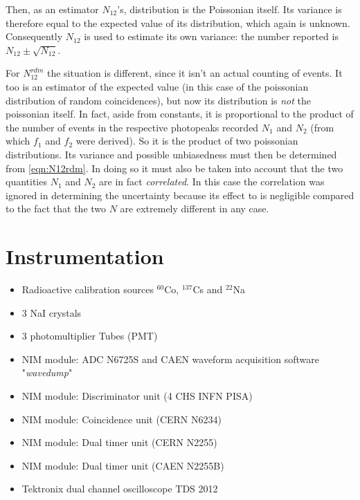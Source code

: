 \documentclass[10pt,a4paper,twocolumn]{article}
\begin{document}
\begin{appendices}
Then, as an estimator $N_{12}$'s, distribution is the Poissonian itself. Its variance is therefore equal to the expected value of its distribution, which again is unknown. Consequently $N_{12}$ is used to estimate its own variance: the number reported is $N_{12} \pm \sqrt{N_{12}}$. 

For $N_{12}^{rdm}$ the situation is different, since it isn't an actual counting of events. It too is an estimator of the expected value (in this case of the poissonian distribution of random coincidences), but now its distribution is \textit{not} the poissonian itself. In fact, aside from constants, it is proportional to the product of the number of events in the respective photopeaks recorded $N_1$ and $N_2$ (from which $f_1$ and $f_2$ were derived). So it is the product of two poissonian distributions. Its variance and possible unbiasedness must then be determined from \ref{eqn:N12rdm}. In doing so it must also be taken into account that the two quantities $N_1$ and $N_2$ are in fact \textit{correlated}. In this case the correlation was ignored in determining the uncertainty because its effect to is negligible compared to the fact that the two $N$ are extremely different in any case.  


\section{Instrumentation}\label{appendix:strumentation}

\begin{itemize}
\item Radioactive calibration sources $^{60}$Co, $^{137}$Cs and $^{22}$Na
\item 3 NaI crystals
\item 3 photomultiplier Tubes (PMT) 
 \item NIM module: ADC N6725S and CAEN waveform acquisition software "\textit{wavedump}" 
\item NIM module: Discriminator unit (4 CHS INFN PISA)
\item NIM module: Coincidence unit (CERN N6234)
   \item NIM module: Dual timer unit (CERN N2255)
  \item NIM module: Dual timer unit (CAEN N2255B)
  \item Tektronix dual channel oscilloscope TDS 2012
        
 \end{itemize}



\end{appendices}
\end{document}
